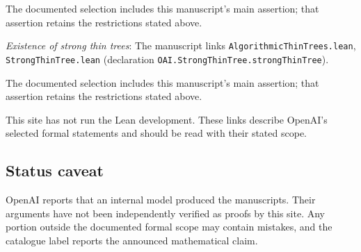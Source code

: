 \documentclass[11pt]{article}
\begin{document}
The documented selection includes this manuscript’s main assertion; that assertion retains the restrictions stated above.

\textit{Existence of strong thin trees}: The manuscript links \texttt{AlgorithmicThinTrees.lean}, \texttt{StrongThinTree.lean} (declaration \texttt{OAI.StrongThinTree.strongThinTree}).

The documented selection includes this manuscript’s main assertion; that assertion retains the restrictions stated above.

This site has not run the Lean development. These links describe OpenAI’s selected formal statements and should be read with their stated scope.

\subsection{Status caveat}
OpenAI reports that an internal model produced the manuscripts. Their arguments have not been independently verified as proofs by this site. Any portion outside the documented formal scope may contain mistakes, and the catalogue label reports the announced mathematical claim.
\end{document}

